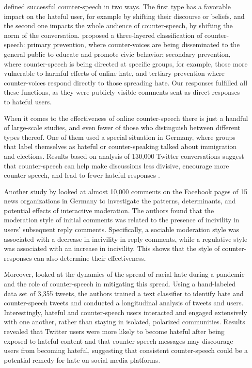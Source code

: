 \documentclass[preprint,12pt]{elsarticle}
\begin{document}
\citet{benesch2016considerations} defined successful counter-speech in two ways. The first type has a favorable impact on the hateful user, for example by shifting their discourse or beliefs, and the second one impacts the whole audience of counter-speech, by shifting the norm of the conversation.  \citet{rieger2018hate} proposed a three-layered classification of counter-speech: primary prevention, where counter-voices are being disseminated to the general public to educate and promote civic behavior; secondary prevention, where counter-speech is being directed at specific groups, for example, those more vulnerable to harmful effects of online hate, and tertiary prevention where counter-voices respond directly to those spreading hate. Our responses fulfilled all these functions, as they were publicly visible comments sent as direct responses to hateful users.

When it comes to the effectiveness of online counter-speech there is just a handful of large-scale  studies, and even fewer of those who distinguish between different types thereof. One of them used a special situation in Germany, where groups that label themselves as hateful or counter-speaking talked about immigration and elections. Results based on analysis of 130,000 Twitter conversations suggest that counter-speech can help make discussions less divisive, encourage more counter-speech, and lead to fewer hateful responses \citep{garland2020countering}. 

Another study by \citet{ziegele2018journalistic} looked at almost 10,000 comments on the Facebook pages of 15 news organizations in Germany to investigate the patterns, determinants, and potential effects of interactive moderation. The authors found that the moderation style of initial comments was related to the presence of incivility in users' subsequent reply comments. Specifically, a sociable moderation style was associated with a decrease in incivility in reply comments, while a regulative style was associated with an increase in incivility. This shows that the style of counter-responses can also determine their effectiveness. 

Moreover,  \citet{ziems2020racism} looked at the dynamics of the spread of racial hate during a pandemic  and the role of counter-speech in mitigating this spread. Using a hand-labeled data set of 3,355 tweets, the authors trained a text classifier to identify hate and counter-speech tweets and conducted a longitudinal analysis of tweets and users. Interestingly, hateful and counter-speech users interacted and engaged extensively with one another, rather than staying in isolated, polarized communities. Results revealed that Twitter users were more likely to become hateful after being exposed to hateful content and that counter-speech messages may discourage users from becoming hateful, suggesting that consistent counter-speech could be a potential remedy for hate on social media platforms. 
\end{document}
